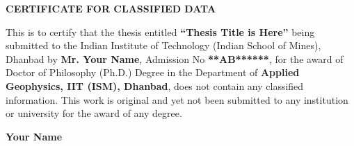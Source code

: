 \newpage

\setlength{\headheight}{5cm} %
\renewcommand{\headrulewidth}{0pt} %


\fancyhead[L]{} %
\fancyhead[C]{} %

\vspace{2cm} %

\begin{center}
    {\textbf{\color{red}\large CERTIFICATE FOR CLASSIFIED DATA}}
\end{center}

\vspace{0.5cm}

\noindent
\justifying
This is to certify that the thesis entitled \textbf{“Thesis Title is Here”} being submitted to the Indian Institute of Technology (Indian School of Mines), Dhanbad by \textbf{ Mr. Your Name}, Admission No \textbf{**AB******}, for the award of Doctor 
of Philosophy (Ph.D.) Degree in the Department of \textbf{Applied Geophysics, IIT (ISM), Dhanbad}, does not contain any classified information. This work is original and yet not been submitted to any institution or university for the award of any degree.


\vspace{0.5cm}

\begin{flushright}
    \textbf{Your Name} %
\end{flushright}

